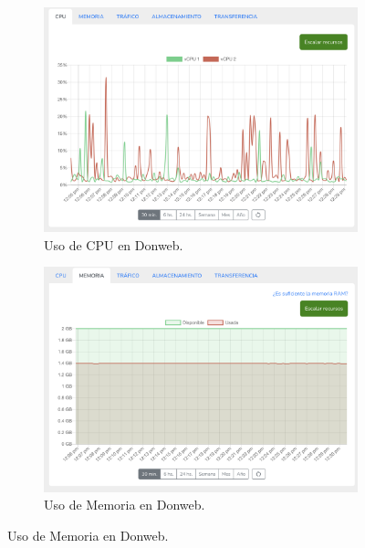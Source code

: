 \begin{figure}[H]
    \centering
    \begin{subfigure}[b]{0.45\textwidth}
        \centering
        \includegraphics[width=\textwidth]{Figures/PortalWeb/CPU-Donweb.png}
        \caption{Uso de CPU en Donweb.}
        \label{fig:cpu-donweb}
    \end{subfigure}
    \hfill
    \begin{subfigure}[b]{0.45\textwidth}
        \centering
        \includegraphics[width=\textwidth]{Figures/PortalWeb/Memoria-Donweb.png}
        \caption{Uso de Memoria en Donweb.}
        \label{fig:memoria-donweb}
    \end{subfigure}
    

\end{figure}

